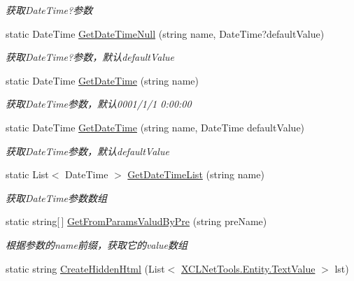 \begin{DoxyCompactItemize}
\begin{DoxyCompactList}\small\item\em 获取\+Date\+Time?参数 \end{DoxyCompactList}\item 
static Date\+Time \hyperlink{class_x_c_l_net_tools_1_1_string_hander_1_1_form_helper_afd47b664fbbce54d65a5e06ec963ddfd}{Get\+Date\+Time\+Null} (string name, Date\+Time?default\+Value)
\begin{DoxyCompactList}\small\item\em 获取\+Date\+Time?参数，默认default\+Value \end{DoxyCompactList}\item 
static Date\+Time \hyperlink{class_x_c_l_net_tools_1_1_string_hander_1_1_form_helper_ab9b36d4dac916c94303c01b1006bc558}{Get\+Date\+Time} (string name)
\begin{DoxyCompactList}\small\item\em 获取\+Date\+Time参数，默认\textquotesingle{}0001/1/1 0\+:00\+:00\textquotesingle{} \end{DoxyCompactList}\item 
static Date\+Time \hyperlink{class_x_c_l_net_tools_1_1_string_hander_1_1_form_helper_adf1ee0dea579cc0333567e9523070ce4}{Get\+Date\+Time} (string name, Date\+Time default\+Value)
\begin{DoxyCompactList}\small\item\em 获取\+Date\+Time参数，默认default\+Value \end{DoxyCompactList}\item 
static List$<$ Date\+Time $>$ \hyperlink{class_x_c_l_net_tools_1_1_string_hander_1_1_form_helper_a5f45de423709334dacacc84764ac9079}{Get\+Date\+Time\+List} (string name)
\begin{DoxyCompactList}\small\item\em 获取\+Date\+Time参数数组 \end{DoxyCompactList}\item 
static string\mbox{[}$\,$\mbox{]} \hyperlink{class_x_c_l_net_tools_1_1_string_hander_1_1_form_helper_a5b0bd096fa3caa418a65570579394201}{Get\+From\+Params\+Valud\+By\+Pre} (string pre\+Name)
\begin{DoxyCompactList}\small\item\em 根据参数的name前缀，获取它的value数组 \end{DoxyCompactList}\item 
static string \hyperlink{class_x_c_l_net_tools_1_1_string_hander_1_1_form_helper_ae6425dda60cd7288371433985e8edb00}{Create\+Hidden\+Html} (List$<$ \hyperlink{class_x_c_l_net_tools_1_1_entity_1_1_text_value}{X\+C\+L\+Net\+Tools.\+Entity.\+Text\+Value} $>$ lst)

\end{DoxyCompactItemize}
